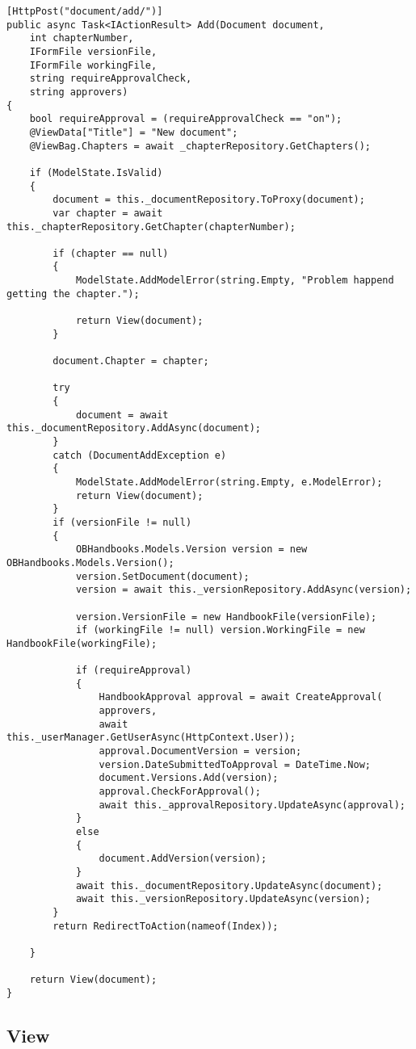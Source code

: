 \begin{lstlisting}
[HttpPost("document/add/")]
public async Task<IActionResult> Add(Document document,
	int chapterNumber,
	IFormFile versionFile,
	IFormFile workingFile,
	string requireApprovalCheck,
	string approvers)
{
	bool requireApproval = (requireApprovalCheck == "on");
	@ViewData["Title"] = "New document";
	@ViewBag.Chapters = await _chapterRepository.GetChapters();

	if (ModelState.IsValid)
	{
		document = this._documentRepository.ToProxy(document);
		var chapter = await this._chapterRepository.GetChapter(chapterNumber);

		if (chapter == null)
		{
			ModelState.AddModelError(string.Empty, "Problem happend getting the chapter.");

			return View(document);
		}

		document.Chapter = chapter;

		try
		{
			document = await this._documentRepository.AddAsync(document);
		}
		catch (DocumentAddException e)
		{
			ModelState.AddModelError(string.Empty, e.ModelError);
			return View(document);
		}
		if (versionFile != null)
		{
			OBHandbooks.Models.Version version = new OBHandbooks.Models.Version();
			version.SetDocument(document);
			version = await this._versionRepository.AddAsync(version);

			version.VersionFile = new HandbookFile(versionFile);
			if (workingFile != null) version.WorkingFile = new HandbookFile(workingFile);

			if (requireApproval)
			{
				HandbookApproval approval = await CreateApproval(
				approvers,
				await this._userManager.GetUserAsync(HttpContext.User));
				approval.DocumentVersion = version;
				version.DateSubmittedToApproval = DateTime.Now;
				document.Versions.Add(version);
				approval.CheckForApproval();
				await this._approvalRepository.UpdateAsync(approval);
			}
			else
			{
				document.AddVersion(version);
			}
			await this._documentRepository.UpdateAsync(document);
			await this._versionRepository.UpdateAsync(version);
		}
		return RedirectToAction(nameof(Index));

	}

	return View(document);
}

\end{lstlisting}

\subsection{View}

